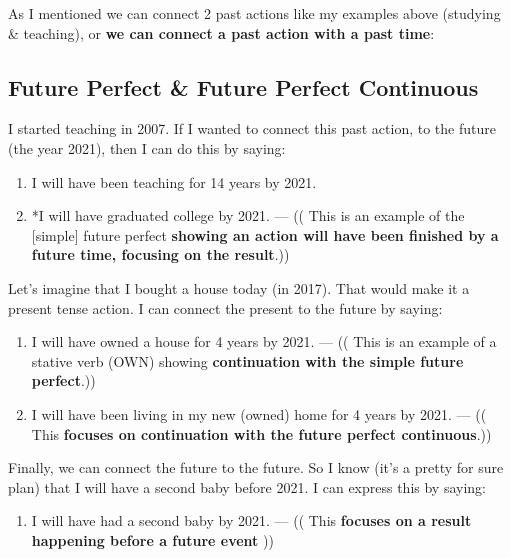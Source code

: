\documentclass{article}
\begin{document}
As I mentioned we can connect 2 past actions like my examples above (studying \& teaching), or \textbf{we can connect a past action with a past time}:

\begin{multienumerate}
\end{multienumerate}

\subsection{Future Perfect \& Future Perfect Continuous}

I started teaching in 2007. If I wanted to connect this past action, to the future (the year 2021), then I can do this by saying:

\begin{enumerate}
	\item I will have been teaching for 14 years by 2021.
	\item *I will have graduated college by 2021. — (( This is an example of the [simple] future perfect \textbf{showing an action will have been finished by a future time, focusing on the result}.))
\end{enumerate}

Let’s imagine that I bought a house today (in 2017). That would make it a present tense action. I can connect the present to the future by saying:

\begin{enumerate}
	\item I will have owned a house for 4 years by 2021. — (( This is an example of a stative verb (OWN) showing \textbf{continuation with the simple future perfect}.))
	\item I will have been living in my new (owned) home for 4 years by 2021. — (( This \textbf{focuses on continuation with the future perfect continuous}.))
\end{enumerate}

Finally, we can connect the future to the future. So I know (it’s a pretty for sure plan) that I will have a second baby before 2021. I can express this by saying:

\begin{enumerate}
	\item I will have had a second baby by 2021. — (( This \textbf{focuses on a result happening before a future event} ))
\end{enumerate}
\end{document}
